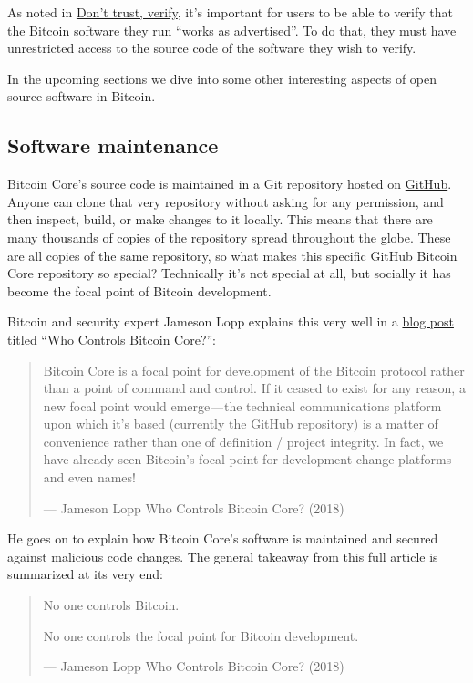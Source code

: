 As noted in \protect\hyperlink{donttrustverify}{Don't trust, verify},
it's important for users to be able to verify that the Bitcoin software
they run ``works as advertised''. To do that, they must have
unrestricted access to the source code of the software they wish to
verify.

In the upcoming sections we dive into some other interesting aspects of
open source software in Bitcoin.

\hypertarget{softwaremaintenance}{%
\subsection{Software maintenance}\label{softwaremaintenance}}

Bitcoin Core's source code is maintained in a Git repository hosted on
\href{https://github.com/bitcoin/bitcoin}{GitHub}. Anyone can clone that
very repository without asking for any permission, and then inspect,
build, or make changes to it locally. This means that there are many
thousands of copies of the repository spread throughout the globe. These
are all copies of the same repository, so what makes this specific
GitHub Bitcoin Core repository so special? Technically it's not special
at all, but socially it has become the focal point of Bitcoin
development.

Bitcoin and security expert Jameson Lopp explains this very well in a
\href{https://blog.lopp.net/who-controls-bitcoin-core-/}{blog post}
titled ``Who Controls Bitcoin Core?'':

\begin{quote}
Bitcoin Core is a focal point for development of the Bitcoin protocol
rather than a point of command and control. If it ceased to exist for
any reason, a new focal point would emerge --- the technical
communications platform upon which it's based (currently the GitHub
repository) is a matter of convenience rather than one of definition /
project integrity. In fact, we have already seen Bitcoin's focal point
for development change platforms and even names!

---  Jameson Lopp Who Controls Bitcoin Core? (2018)
\end{quote}

He goes on to explain how Bitcoin Core's software is maintained and
secured against malicious code changes. The general takeaway from this
full article is summarized at its very end:

\begin{quote}
No one controls Bitcoin.

No one controls the focal point for Bitcoin development.

---  Jameson Lopp Who Controls Bitcoin Core? (2018)
\end{quote}


